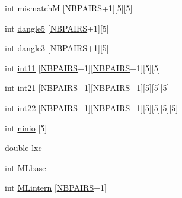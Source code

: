 \begin{DoxyCompactItemize}
\item 
int \mbox{\hyperlink{group__energy__parameters_afcc32f63f2c829bfb0016db82f7810fc}{mismatchM}} \mbox{[}\mbox{\hyperlink{energy__const_8h_a5e75221c779d618eab81e096f37e32ce}{N\+B\+P\+A\+I\+RS}}+1\mbox{]}\mbox{[}5\mbox{]}\mbox{[}5\mbox{]}
\item 
int \mbox{\hyperlink{group__energy__parameters_ad2534b54836d48b4f549b319766f658f}{dangle5}} \mbox{[}\mbox{\hyperlink{energy__const_8h_a5e75221c779d618eab81e096f37e32ce}{N\+B\+P\+A\+I\+RS}}+1\mbox{]}\mbox{[}5\mbox{]}
\item 
int \mbox{\hyperlink{group__energy__parameters_a75c644da73d4d01c86b5f6a1e3af3ae9}{dangle3}} \mbox{[}\mbox{\hyperlink{energy__const_8h_a5e75221c779d618eab81e096f37e32ce}{N\+B\+P\+A\+I\+RS}}+1\mbox{]}\mbox{[}5\mbox{]}
\item 
int \mbox{\hyperlink{group__energy__parameters_a585e235827774a0073be22bf00e48c30}{int11}} \mbox{[}\mbox{\hyperlink{energy__const_8h_a5e75221c779d618eab81e096f37e32ce}{N\+B\+P\+A\+I\+RS}}+1\mbox{]}\mbox{[}\mbox{\hyperlink{energy__const_8h_a5e75221c779d618eab81e096f37e32ce}{N\+B\+P\+A\+I\+RS}}+1\mbox{]}\mbox{[}5\mbox{]}\mbox{[}5\mbox{]}
\item 
int \mbox{\hyperlink{group__energy__parameters_a983245e30d7a41a3102e5e5ea4bec7e2}{int21}} \mbox{[}\mbox{\hyperlink{energy__const_8h_a5e75221c779d618eab81e096f37e32ce}{N\+B\+P\+A\+I\+RS}}+1\mbox{]}\mbox{[}\mbox{\hyperlink{energy__const_8h_a5e75221c779d618eab81e096f37e32ce}{N\+B\+P\+A\+I\+RS}}+1\mbox{]}\mbox{[}5\mbox{]}\mbox{[}5\mbox{]}\mbox{[}5\mbox{]}
\item 
int \mbox{\hyperlink{group__energy__parameters_ad56fdeadc2a2e51b9f23b2c26d067ec4}{int22}} \mbox{[}\mbox{\hyperlink{energy__const_8h_a5e75221c779d618eab81e096f37e32ce}{N\+B\+P\+A\+I\+RS}}+1\mbox{]}\mbox{[}\mbox{\hyperlink{energy__const_8h_a5e75221c779d618eab81e096f37e32ce}{N\+B\+P\+A\+I\+RS}}+1\mbox{]}\mbox{[}5\mbox{]}\mbox{[}5\mbox{]}\mbox{[}5\mbox{]}\mbox{[}5\mbox{]}
\item 
int \mbox{\hyperlink{group__energy__parameters_ac03c4835310b225a64ea9eb77a174940}{ninio}} \mbox{[}5\mbox{]}
\item 
double \mbox{\hyperlink{group__energy__parameters_a24ea058414d3fb918c7fbf189a4a1e51}{lxc}}
\item 
int \mbox{\hyperlink{group__energy__parameters_a6fd54883ec8b69345e970ad372f83679}{M\+Lbase}}
\item 
int \mbox{\hyperlink{group__energy__parameters_a28c7b54d5e8edf9a1121a2d1f9c98e7f}{M\+Lintern}} \mbox{[}\mbox{\hyperlink{energy__const_8h_a5e75221c779d618eab81e096f37e32ce}{N\+B\+P\+A\+I\+RS}}+1\mbox{]}

\end{DoxyCompactItemize}
